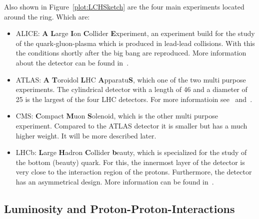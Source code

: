 Also shown in Figure~\ref{plot:LCHSketch} are the four main experiments located around the ring. Which are:
\begin{itemize}
\item{ALICE}: \textbf{A} \textbf{L}arge \textbf{I}on \textbf{C}ollider \textbf{E}xperiment, an experiment build for the study of the quark-gluon-plasma which is produced in lead-lead collisions. With this the conditions shortly after the big bang are reproduced. More information about the detector can be found in~.
\item{ATLAS}: \textbf{A} \textbf{T}oroidol \textbf{L}HC \textbf{A}pparatu\textbf{S}, which one of the two multi purpose experiments. The cylindrical detector with a length of 46\m{} and a diameter of 25\m{} is the largest of the four LHC detectors. For more informatioin see~ and~.
\item{CMS}: \textbf{C}ompact \textbf{M}uon \textbf{S}olenoid, which is the other multi purpose experiment. Compared to the ATLAS detector it is smaller but has a much higher weight. It will be more described later.
\item{LHCb}: \textbf{L}arge \textbf{H}adron \textbf{C}ollider \textbf{b}eauty, which is specialized for the study of the bottom (beauty) quark. For this, the innermost layer of the detector is very close to the interaction region of the protons. Furthermore, the detector has an asymmetrical design. More information can be found in~.
\end{itemize}


\subsection{Luminosity and Proton-Proton-Interactions \label{sec:IntroLumiPPI}}

